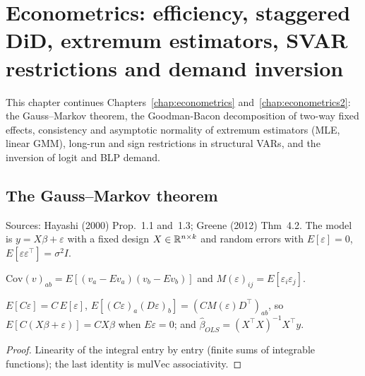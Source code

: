 \chapter{Econometrics: efficiency, staggered DiD, extremum estimators, SVAR restrictions and demand inversion}
\label{chap:econometrics3}

This chapter continues Chapters~\ref{chap:econometrics} and~\ref{chap:econometrics2}: the Gauss--Markov theorem, the
Goodman-Bacon decomposition of two-way fixed effects, consistency and asymptotic normality of extremum estimators
(MLE, linear GMM), long-run and sign restrictions in structural VARs, and the inversion of logit and BLP demand.

\section{The Gauss--Markov theorem}
\label{sec:gauss-markov}

Sources: Hayashi (2000) Prop.~1.1 and~1.3; Greene (2012) Thm~4.2. The model is $y = X\beta + \varepsilon$ with a fixed
design $X\in\mathbb{R}^{n\times k}$ and random errors with $E[\varepsilon] = 0$, $E[\varepsilon\varepsilon^\top] = \sigma^2 I$.

\begin{definition}
\label{def:cov}
\leanok
$\mathrm{Cov}(v)_{ab} = E[(v_a - Ev_a)(v_b - Ev_b)]$ and $M(\varepsilon)_{ij} = E[\varepsilon_i\varepsilon_j]$.
\end{definition}

\begin{lemma}
\label{lem:linear-moments}
\leanok
{}
$E[C\varepsilon] = C\,E[\varepsilon]$, $E[(C\varepsilon)_a(D\varepsilon)_b] = (CM(\varepsilon)D^\top)_{ab}$, so
$E[C(X\beta+\varepsilon)] = CX\beta$ when $E\varepsilon = 0$; and $\hat\beta_{OLS} = (X^\top X)^{-1}X^\top y$.
\end{lemma}
\begin{proof}
\leanok
Linearity of the integral entry by entry (finite sums of integrable functions); the last identity is
$\mathrm{mulVec}$ associativity.
\end{proof}

